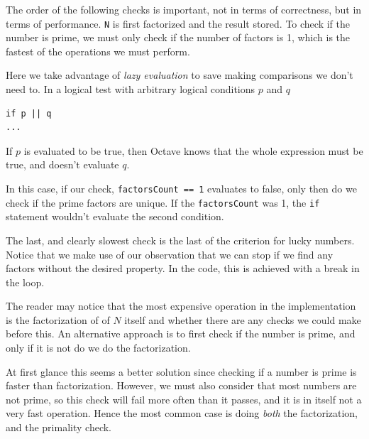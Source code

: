 \documentclass[10pt]{article}
\begin{document}
The order of the following checks is important, not in terms of correctness, but in terms of performance.  \texttt{N} is first factorized and the result stored. To check if the number is prime, we must only check if the number of factors is 1, which is the fastest of the operations we must perform.

Here we take advantage of \emph{lazy evaluation} to save making comparisons we don't need to. In a logical test with arbitrary logical conditions $p$ and $q$

\begin{verbatim}
if p || q
...
\end{verbatim}

If $p$ is evaluated to be true, then Octave knows that the whole expression must be true, and doesn't evaluate $q$. 

In this case, if our check, \texttt{factorsCount == 1} evaluates to false, only then do we check if the prime factors are unique. If the \texttt{factorsCount} was 1, the \texttt{if} statement wouldn't evaluate the second condition.

The last, and clearly slowest check is the last  of the criterion for lucky numbers. Notice that we make use of our observation that we can stop if we find any factors without the desired property. In the code, this is achieved with a break in the loop.

The reader may notice that the most expensive operation in the implementation is the factorization of of $N$ itself and whether there are any checks we could make before this. An alternative approach is to first check if the number is prime, and only if it is not do we do the factorization. 

At first glance this seems a better solution since checking if a number is prime is faster than factorization. However, we must also consider that most numbers are not prime, so this check will fail more often than it passes, and it is in itself not a very fast operation. Hence the most common case is doing \emph{both} the factorization, and the primality check.
\end{document}
